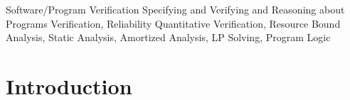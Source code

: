 \documentclass{sigplanconf}
\newcommand{\ifshort}[2]{\ifx\fullversion\undefined{#1}\else{#2}\fi}
\newcommand{\sectskip}[0]{\ifshort{\vspace{-3pt}}{}}
\newcommand{\aftersectskip}[0]{\ifshort{\vspace{-1pt}}{}}
\begin{document}
\begin{abstract}
%
\end{abstract}

{Software/Program Verification}
{Specifying and Verifying and Reasoning about Programs}
\vspace{-3pt}
\terms Verification, Reliability
\vspace{-3pt}
\keywords Quantitative Verification, Resource Bound Analysis, Static
Analysis, Amortized Analysis, LP Solving, Program Logic

\sectskip
\section{Introduction}
\label{sec:intro}
\aftersectskip
\end{document}
